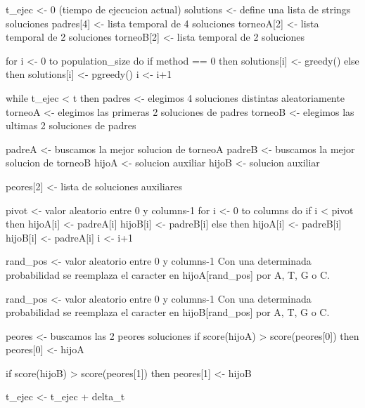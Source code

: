 t_ejec <- 0 (tiempo de ejecucion actual)
solutions <- define una lista de strings soluciones
padres[4] <- lista temporal de 4 soluciones
torneoA[2] <- lista temporal de 2 soluciones
torneoB[2] <- lista temporal de 2 soluciones

for i <- 0 to population_size do
    if method == 0 then
        solutions[i] <- greedy()
    else then
        solutions[i] <- pgreedy()
    i <- i+1
    
while t_ejec < t then
    padres <- elegimos 4 soluciones distintas aleatoriamente
    torneoA <- elegimos las primeras 2 soluciones de padres
    torneoB <- elegimos las ultimas 2 soluciones de padres

    padreA <- buscamos la mejor solucion de torneoA
    padreB <- buscamos la mejor solucion de torneoB
    hijoA <- solucion auxiliar
    hijoB <- solucion auxiliar

    peores[2] <- lista de soluciones auxiliares

    pivot <- valor aleatorio entre 0 y columns-1
	for i <- 0 to columns do
		if i < pivot then
            hijoA[i] <- padreA[i]
			hijoB[i] <- padreB[i]
		else then
            hijoA[i] <- padreB[i]
			hijoB[i] <- padreA[i]
        i <- i+1

    rand_pos <- valor aleatorio entre 0 y columns-1
    Con una determinada probabilidad se reemplaza
    el caracter en hijoA[rand_pos] por A, T, G o C.

    rand_pos <- valor aleatorio entre 0 y columns-1
    Con una determinada probabilidad se reemplaza
    el caracter en hijoB[rand_pos] por A, T, G o C.

    peores <- buscamos las 2 peores soluciones
    if score(hijoA) > score(peores[0]) then
        peores[0] <- hijoA

    if score(hijoB) > score(peores[1]) then
        peores[1] <- hijoB

    t_ejec <- t_ejec + delta_t